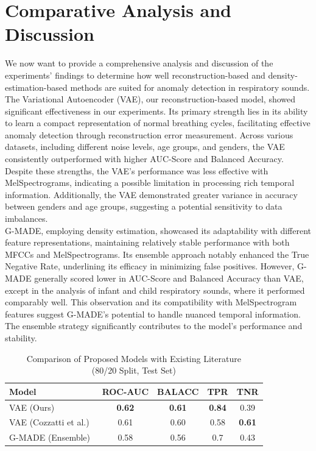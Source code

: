 \section{Comparative Analysis and Discussion}
We now want to provide a comprehensive analysis and discussion of the experiments' findings to determine how well reconstruction-based and density-estimation-based methods are suited for anomaly detection in respiratory sounds.
The Variational Autoencoder (VAE), our reconstruction-based model, showed significant effectiveness in our experiments. Its primary strength lies in its ability to learn a compact representation of normal breathing cycles, facilitating effective anomaly detection through reconstruction error measurement. Across various datasets, including different noise levels, age groups, and genders, the VAE consistently outperformed with higher AUC-Score and Balanced Accuracy.\\
Despite these strengths, the VAE's performance was less effective with MelSpectrograms, indicating a possible limitation in processing rich temporal information. Additionally, the VAE demonstrated greater variance in accuracy between genders and age groups, suggesting a potential sensitivity to data imbalances.\\
G-MADE, employing density estimation, showcased its adaptability with different feature representations, maintaining relatively stable performance with both MFCCs and MelSpectrograms. Its ensemble approach notably enhanced the True Negative Rate, underlining its efficacy in minimizing false positives. However, G-MADE generally scored lower in AUC-Score and Balanced Accuracy than VAE, except in the analysis of infant and child respiratory sounds, where it performed comparably well. This observation and its compatibility with MelSpectrogram features suggest G-MADE's potential to handle nuanced temporal information. The ensemble strategy significantly contributes to the model's performance and stability.\\

\begin{table}[h!]
    \centering
    \caption{Comparison of Proposed Models with Existing Literature\\(80/20 Split, Test Set)}
    \begin{tabular}{|l|c|c|c|c|}
    \hline
    \textbf{Model} & \textbf{ROC-AUC} & \textbf{BALACC} & \textbf{TPR} & \textbf{TNR} \\
    \hline
    VAE (Ours) & \textbf{0.62} & \textbf{0.61} & \textbf{0.84} & 0.39 \\
    VAE (Cozzatti et al.)~\cite{cozzatti2022variational} & 0.61 & 0.60 & 0.58 & \textbf{0.61} \\
    G-MADE (Ensemble) & 0.58 & 0.56 & 0.7 & 0.43 \\
    \hline
    \end{tabular}
\end{table}


